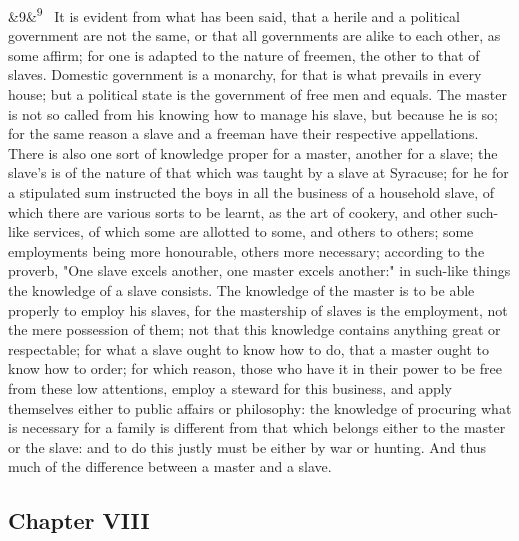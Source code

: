 \documentclass[12pt]{article}
\newcommand{\para}[1][]{\par\noindent\ifx&#1&\else\textsuperscript{\footnotesize #1}~\fi}
\begin{document}
\para[9] It is evident from what has been said, that a herile and a political government are not the same, or that all governments are alike to each other, as some affirm; for one is adapted to the nature of freemen, the other to that of slaves. Domestic government is a monarchy, for that is what prevails in every house; but a political state is the government of free men and equals. The master is not so called from his knowing how to manage his slave, but because he is so; for the same reason a slave and a freeman have their respective appellations. There is also one sort of knowledge proper for a master, another for a slave; the slave's is of the nature of that which was taught by a slave at Syracuse; for he for a stipulated sum instructed the boys in all the business of a household slave, of which there are various sorts to be learnt, as the art of cookery, and other such-like services, of which some are allotted to some, and others to others; some employments being more honourable, others more necessary; according to the proverb, "One slave excels another, one master excels another:" in such-like things the knowledge of a slave consists. The knowledge of the master is to be able properly to employ his slaves, for the mastership of slaves is the employment, not the mere possession of them; not that this knowledge contains anything great or respectable; for what a slave ought to know how to do, that a master ought to know how to order; for which reason, those who have it in their power to be free from these low attentions, employ a steward for this business, and apply themselves either to public affairs or philosophy: the knowledge of procuring what is necessary for a family is different from that which belongs either to the master or the slave: and to do this justly must be either by war or hunting. And thus much of the difference between a master and a slave.

\subsection*{Chapter VIII}
\end{document}
